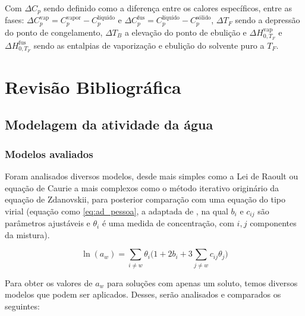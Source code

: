 \documentclass[
	12pt,				%
	openright,
	twoside,
	a4paper,			%
	english,			%
	french,				%
	spanish,			%
	brazil				%
	]{abntex2}
\begin{document}
Com $\Delta C_p$ sendo definido como a diferença entre os calores
específicos, entre as fases: $\Delta C_p^\text{vap} = C_p^\text{vapor} -%
C_p^\text{líquido}$ e $\Delta C_p^\text{fus} = C_p^\text{líquido} -%
C_p^\text{sólido}$, $\Delta T_F$ sendo a depressão do ponto de congelamento,
$\Delta T_B$ a elevação do ponto de ebulição e $\Delta H_{0,T_F}^\text{vap}$ e
$\Delta H_{0,T_F}^\text{fus}$ sendo as entalpias de vaporização e ebulição do
solvente puro a $T_F$.

\part{Revisão Bibliográfica}

\chapter{Modelagem da atividade da água}

\section{Modelos avaliados}

Foram analisados diversos modelos, desde mais simples como a Lei de Raoult ou
equação de Caurie a mais complexos como o método iterativo originário da equação
de Zdanovskii, para posterior comparação com uma equação do tipo virial (equação
como \ref{eq:ad_pessoa}, a adaptada de \cite{pessoa2008}, na qual $b_i$ e
$c_{ij}$ são parâmetros ajustáveis e $\theta_i$ é uma medida de concentração,
com $i,j$ componentes da mistura).

\begin{equation}
	\label{eq:ad_pessoa}
	\ln(a_w) = \sum_{i \neq w}\theta_i\Bigg(1 +%
	2b_i+3\sum_{j \neq w}c_{ij}\theta_j\Bigg)
\end{equation}

Para obter os valores de $a_w$ para soluções com apenas um soluto, temos
diversos modelos que podem ser aplicados. Desses, serão analisados e comparados
os seguintes:
\end{document}
